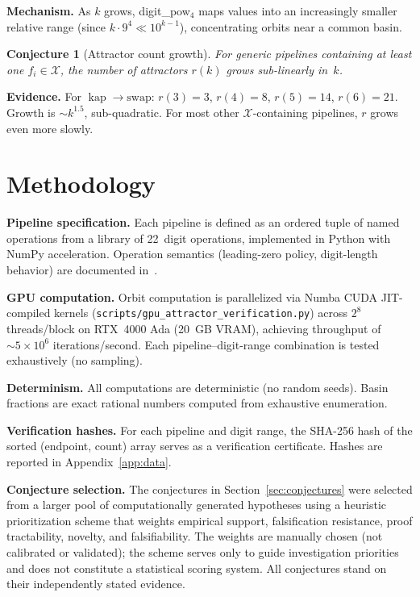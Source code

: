 \documentclass[11pt,a4paper]{amsart}
\theoremstyle{plain}
\newtheorem{conjecture}[theorem]{Conjecture}
\theoremstyle{definition}
\theoremstyle{remark}
\DeclareMathOperator{\kap}{kap}
\begin{document}
\textbf{Mechanism.} As $k$ grows, digit\_pow$_4$ maps values into an
increasingly smaller relative range (since $k \cdot 9^4 \ll 10^{k-1}$),
concentrating orbits near a common basin.

\begin{conjecture}[Attractor count growth]\label{conj:C3}
For generic pipelines containing at least one $f_i \in \mathcal{X}$,
the number of attractors $r(k)$ grows sub-linearly in~$k$.
\end{conjecture}

\textbf{Evidence.} For $\kap \to \text{swap}$: $r(3) = 3$, $r(4) = 8$,
$r(5) = 14$, $r(6) = 21$. Growth is $\sim k^{1.5}$, sub-quadratic.
For most other $\mathcal{X}$-containing pipelines, $r$ grows even more
slowly.

\section{Methodology}\label{sec:methodology}

\textbf{Pipeline specification.}
Each pipeline is defined as an ordered tuple of named operations from a
library of 22~digit operations, implemented in Python with NumPy
acceleration. Operation semantics (leading-zero policy, digit-length
behavior) are documented in~\cite{PaperA}.

\textbf{GPU computation.}
Orbit computation is parallelized via Numba CUDA JIT-compiled kernels
(\texttt{scripts/gpu\_attractor\_verification.py}) across $2^8$
threads/block on RTX~4000 Ada (20~GB VRAM), achieving throughput of
${\sim}5 \times 10^6$ iterations/second. Each pipeline--digit-range
combination is tested exhaustively (no sampling).

\textbf{Determinism.}
All computations are deterministic (no random seeds). Basin fractions are
exact rational numbers computed from exhaustive enumeration.

\textbf{Verification hashes.}
For each pipeline and digit range, the SHA-256 hash of the sorted
(endpoint, count) array serves as a verification certificate. Hashes are
reported in Appendix~\ref{app:data}.

\textbf{Conjecture selection.}
The conjectures in Section~\ref{sec:conjectures} were selected from a larger
pool of computationally generated hypotheses using a heuristic prioritization
scheme that weights empirical support, falsification resistance, proof
tractability, novelty, and falsifiability. The weights are manually chosen
(not calibrated or validated); the scheme serves only to guide investigation
priorities and does not constitute a statistical scoring system. All
conjectures stand on their independently stated evidence.
\end{document}
